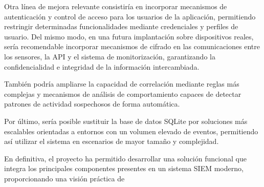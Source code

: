 Otra línea de mejora relevante consistiría en incorporar mecanismos de autenticación y control de acceso para los usuarios de la aplicación, permitiendo restringir determinadas funcionalidades mediante credenciales y perfiles de usuario. Del mismo modo, en una futura implantación sobre dispositivos reales, sería recomendable incorporar mecanismos de cifrado en las comunicaciones entre los sensores, la API y el sistema de monitorización, garantizando la confidencialidad e integridad de la información intercambiada.

También podría ampliarse la capacidad de correlación mediante reglas más complejas y mecanismos de análisis de comportamiento capaces de detectar patrones de actividad sospechosos de forma automática.

Por último, sería posible sustituir la base de datos SQLite por soluciones más escalables orientadas a entornos con un volumen elevado de eventos, permitiendo así utilizar el sistema en escenarios de mayor tamaño y complejidad.

En definitiva, el proyecto ha permitido desarrollar una solución funcional que integra los principales componentes presentes en un sistema SIEM moderno, proporcionando una visión práctica de

